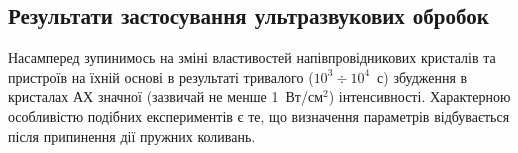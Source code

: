 
\subsection{Результати застосування ультразвукових обробок}

Насамперед зупинимось на зміні властивостей напівпровідникових кристалів та пристроїв на їхній основі в результаті тривалого ($10^3\div10^4$~с) збудження в кристалах АХ значної (зазвичай не менше 1~Вт/см$^2$) інтенсивності.
Характерною особливістю подібних експериментів є те, що визначення параметрів відбувається після припинення дії пружних коливань.

